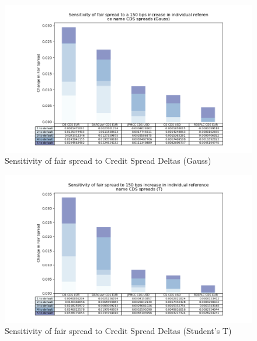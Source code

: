 \documentclass{report}
\theoremstyle{plain}
\theoremstyle{definition}
\begin{document}
\begin{figure}[H]
	\begin{center}
		\includegraphics[width=15cm]{Sensitivity_of_fair_spread_to_a_150_bps_increase_in_individual_reference_name_CDS_spreads_(Gauss).png}
		\caption{Sensitivity of fair spread to Credit Spread Deltas (Gauss)} 
		\label{Sensitivity_of_fair_spread_to_a_150_bps_increase_in_individual_reference_name_CDS_spreads._(Gauss)}
	\end{center}
\end{figure}


\begin{figure}[H]
	\begin{center}
		\includegraphics[width=15cm]{Sensitivity_of_fair_spread_to_150_bps_increase_in_individual_reference_name_CDS_spreads_(T).png}
		\caption{Sensitivity of fair spread to Credit Spread Deltas (Student's T)} 
		\label{Sensitivity_of_fair_spread_to_150_bps_increase_in_individual_reference_name_CDS_spreads._(T)}
	\end{center}
\end{figure}
\end{document}
